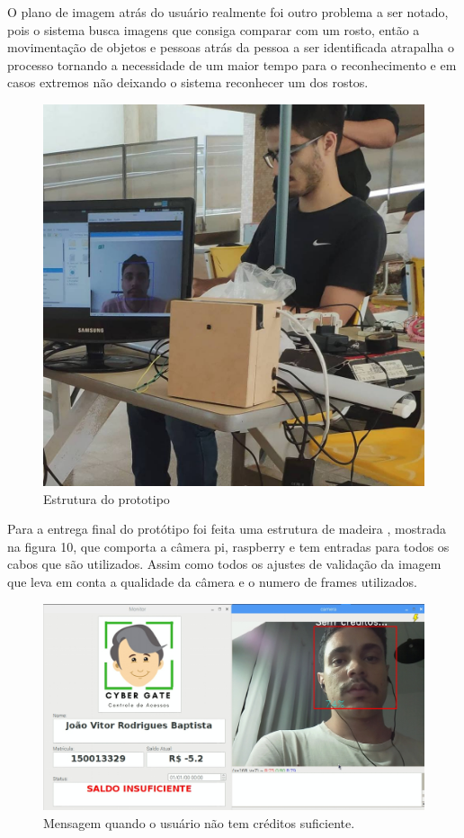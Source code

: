 \documentclass[conference,compsoc]{IEEEtran}
\begin{document}
	O plano de imagem atrás do usuário realmente foi outro problema a ser notado, pois o sistema busca imagens que consiga comparar com um rosto, então a movimentação de objetos e pessoas atrás da pessoa a ser identificada atrapalha o processo tornando a necessidade de um maior tempo para o reconhecimento e em casos extremos não deixando o sistema reconhecer um dos rostos.
	
	\begin{figure}[!ht]
		\centering
		\includegraphics[scale=0.20]{projeto.jpg}
		\caption{Estrutura do prototipo}
\end{figure}



Para a entrega final do protótipo foi feita uma estrutura de madeira , mostrada na figura 10, que comporta a câmera pi, raspberry e tem entradas para todos os cabos que são utilizados. Assim como todos os ajustes de validação da imagem que leva em conta a qualidade da câmera e o numero de frames utilizados.

\begin{figure}[!ht]
		\centering
		\includegraphics[scale=0.20]{camera_invalido.png}
		\caption{Mensagem quando o usuário não tem créditos suficiente.}
\end{figure}
\end{document}
